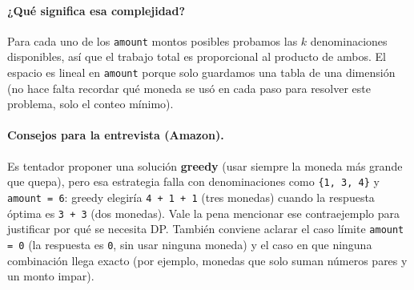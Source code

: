 


\paragraph{¿Qué significa esa complejidad?} Para cada uno de los
\texttt{amount} montos posibles probamos las $k$ denominaciones disponibles,
así que el trabajo total es proporcional al producto de ambos. El espacio es
lineal en \texttt{amount} porque solo guardamos una tabla de una dimensión
(no hace falta recordar qué moneda se usó en cada paso para resolver este
problema, solo el conteo mínimo).

\paragraph{Consejos para la entrevista (Amazon).} Es tentador proponer una
solución \textbf{greedy} (usar siempre la moneda más grande que quepa), pero
esa estrategia falla con denominaciones como \texttt{\{1, 3, 4\}} y
\texttt{amount = 6}: greedy elegiría \texttt{4 + 1 + 1} (tres monedas)
cuando la respuesta óptima es \texttt{3 + 3} (dos monedas). Vale la pena
mencionar ese contraejemplo para justificar por qué se necesita DP. También
conviene aclarar el caso límite \texttt{amount = 0} (la respuesta es
\texttt{0}, sin usar ninguna moneda) y el caso en que ninguna combinación
llega exacto (por ejemplo, monedas que solo suman números pares y un monto
impar).
